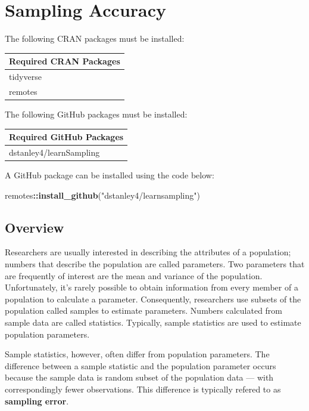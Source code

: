 \documentclass[
]{krantz}
\makeatletter
\newenvironment{Shaded}{\begin{snugshade}}{\end{snugshade}}
\newcommand{\KeywordTok}[1]{\textcolor[rgb]{0.27,0.27,0.27}{\textbf{#1}}}
\newcommand{\NormalTok}[1]{#1}
\newcommand{\OperatorTok}[1]{\textcolor[rgb]{0.43,0.43,0.43}{\textbf{#1}}}
\newcommand{\StringTok}[1]{\textcolor[rgb]{0.5,0.5,0.5}{#1}}
\newenvironment{kframe}{%
\medskip{}
\setlength{\fboxsep}{.8em}
 \def\at@end@of@kframe{}%
 \ifinner\ifhmode%
  \def\at@end@of@kframe{\end{minipage}}%
  \begin{minipage}{\columnwidth}%
 \fi\fi%
 \def\FrameCommand##1{\hskip\@totalleftmargin \hskip-\fboxsep
 \colorbox{shadecolor}{##1}\hskip-\fboxsep
     \hskip-\linewidth \hskip-\@totalleftmargin \hskip\columnwidth}%
 \MakeFramed {\advance\hsize-\width
   \@totalleftmargin\z@ \linewidth\hsize
   \@setminipage}}%
 {\par\unskip\endMakeFramed%
 \at@end@of@kframe}
\renewenvironment{Shaded}{\begin{kframe}}{\end{kframe}}
\makeatother
\begin{document}
\hypertarget{sampling-accuracy}{%
\chapter{Sampling Accuracy}\label{sampling-accuracy}}

The following CRAN packages must be installed:

\begin{longtable}[]{@{}l@{}}
\toprule
Required CRAN Packages\tabularnewline
\midrule
\endhead
tidyverse\tabularnewline
remotes\tabularnewline
\bottomrule
\end{longtable}

The following GitHub packages must be installed:

\begin{longtable}[]{@{}l@{}}
\toprule
Required GitHub Packages\tabularnewline
\midrule
\endhead
dstanley4/learnSampling\tabularnewline
\bottomrule
\end{longtable}

A GitHub package can be installed using the code below:

\begin{Shaded}
\begin{Highlighting}[]
\NormalTok{remotes}\OperatorTok{::}\KeywordTok{install_github}\NormalTok{(}\StringTok{"dstanley4/learnsampling"}\NormalTok{)}
\end{Highlighting}
\end{Shaded}

\hypertarget{overview}{%
\section{Overview}\label{overview}}

Researchers are usually interested in describing the attributes of a population; numbers that describe the population are called parameters. Two parameters that are frequently of interest are the mean and variance of the population. Unfortunately, it's rarely possible to obtain information from every member of a population to calculate a parameter. Consequently, researchers use subsets of the population called samples to estimate parameters. Numbers calculated from sample data are called statistics. Typically, sample statistics are used to estimate population parameters.

Sample statistics, however, often differ from population parameters. The difference between a sample statistic and the population parameter occurs because the sample data is random subset of the population data --- with correspondingly fewer observations. This difference is typically refered to as \textbf{sampling error}.
\end{document}
